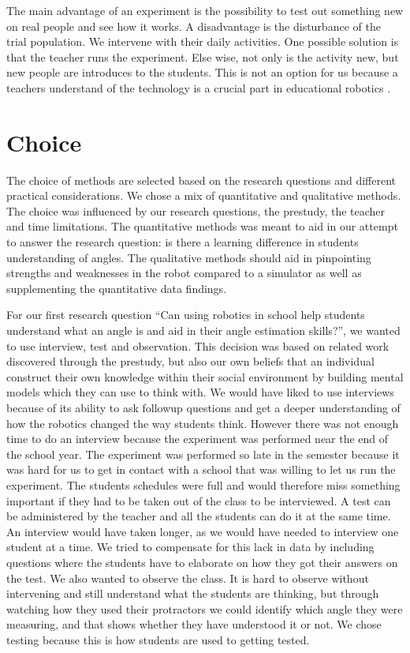 \bigskip\noindent
The main advantage of an experiment is the possibility  to test out something new on real people and see how it works.
A disadvantage is the disturbance of the trial population. We intervene with their daily activities. One possible solution is that the teacher runs the experiment. Else wise, not only is the activity new, but new people are introduces to the students. This is not an option for us because a teachers understand of the technology is a crucial part in educational robotics \cite{fernandes2006using, miller2008robots}.

\section{Choice}
The choice of methods are selected based on the research questions and different practical considerations. We chose a mix of quantitative and qualitative methods. The choice was influenced by our research questions, the prestudy, the teacher and time limitations. The quantitative methods was meant to aid in our attempt to answer the research question: is there a learning difference in students understanding of angles. The qualitative methods should aid in pinpointing strengths and weaknesses in the robot compared to a simulator as well as supplementing the quantitative data findings. 

\bigskip\noindent
For our first research question ``Can using robotics in school help students understand what an angle is and aid in their angle estimation skills?'', we wanted to use interview, test and observation. This decision was based on related work discovered through the prestudy, but also our own beliefs that an individual construct their own knowledge within their social environment by building mental models which they can use to think with. We would have liked to use interviews because of its ability to ask followup questions and get a deeper understanding of how the robotics changed the way students think. However there was not enough time to do an interview because the experiment was performed near the end of the school year. The experiment was performed so late in the semester because it was hard for us to get in contact with a school that was willing to let us run the experiment. The students schedules were full and would therefore miss something important if they had to be taken out of the class to be interviewed. A test can be administered by the teacher and all the students can do it at the same time. An interview would have taken longer, as we would have needed to interview one student at a time. We tried to compensate for this lack in data by including questions where the students have to elaborate on how they got their answers on the test. We also wanted to observe the class. It is hard to observe without intervening and still understand what the students are thinking, but through watching how they used their protractors we could identify which angle they were measuring, and that shows whether they have understood it or not. We chose testing because this is how students are used to getting tested.

